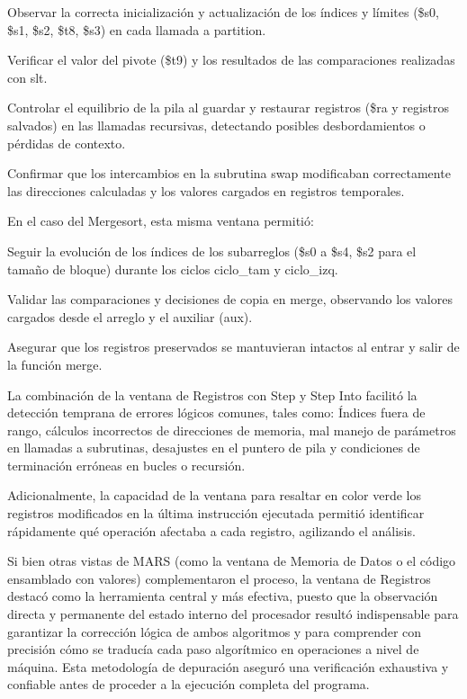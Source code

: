 \documentclass[12pt, letterpaper]{article}
\begin{document}
Observar la correcta inicialización y actualización de los índices y límites (\$s0, \$s1, \$s2, \$t8, \$s3) en cada llamada a partition.

Verificar el valor del pivote (\$t9) y los resultados de las comparaciones realizadas con slt.

Controlar el equilibrio de la pila al guardar y restaurar registros (\$ra y registros salvados) en las llamadas recursivas, detectando posibles desbordamientos o pérdidas de contexto.

Confirmar que los intercambios en la subrutina swap modificaban correctamente las direcciones calculadas y los valores cargados en registros temporales.

En el caso del Mergesort, esta misma ventana permitió:

Seguir la evolución de los índices de los subarreglos (\$s0 a \$s4, \$s2 para el tamaño de bloque) durante los ciclos ciclo\_tam y ciclo\_izq.

Validar las comparaciones y decisiones de copia en merge, observando los valores cargados desde el arreglo y el auxiliar (aux).

Asegurar que los registros preservados se mantuvieran intactos al entrar y salir de la función merge.

La combinación de la ventana de Registros con Step y Step Into facilitó la detección temprana de errores lógicos comunes, tales como: Índices fuera de rango, cálculos incorrectos de direcciones de memoria, mal manejo de parámetros en llamadas a subrutinas, desajustes en el puntero de pila y condiciones de terminación erróneas en bucles o recursión.

Adicionalmente, la capacidad de la ventana para resaltar en color verde los registros modificados en la última instrucción ejecutada permitió identificar rápidamente qué operación afectaba a cada registro, agilizando el análisis.

Si bien otras vistas de MARS (como la ventana de Memoria de Datos o el código ensamblado con valores) complementaron el proceso, la ventana de Registros destacó como la herramienta central y más efectiva, puesto que la observación directa y permanente del estado interno del procesador resultó indispensable para garantizar la corrección lógica de ambos algoritmos y para comprender con precisión cómo se traducía cada paso algorítmico en operaciones a nivel de máquina. Esta metodología de depuración aseguró una verificación exhaustiva y confiable antes de proceder a la ejecución completa del programa.\newpage
\end{document}
